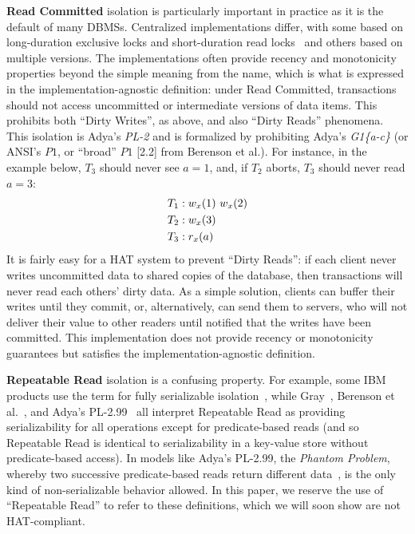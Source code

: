 \textbf{Read Committed} isolation is particularly important in
practice as it is the default of many DBMSs. Centralized
implementations differ, with some based on long-duration exclusive
locks and short-duration read locks~\cite{gray-isolation} and others
based on multiple versions. The implementations often provide recency
and monotonicity properties beyond the simple meaning from the name,
which is what is expressed in the implementation-agnostic definition:
under Read Committed, transactions should not access uncommitted or
intermediate versions of data items. This prohibits both ``Dirty
Writes'', as above, and also ``Dirty Reads'' phenomena.  This
isolation is Adya's \textit{PL-2} and is formalized by prohibiting
Adya's \textit{G1\{a-c\}} (or ANSI's $P1$, or ``broad'' $P1$ [2.2]
from Berenson et al.). For instance, in the example below, $T_3$
should never see $a=1$, and, if $T_2$ aborts, $T_3$ should never read
$a=3$:
\begin{align*}
\small\vspace{-1em}
T_1 &: w_x(1)~w_x(2)
\\T_2 &: w_x(3)\\
T_3 &: r_x(a)\vspace{-1em}
\end{align*}
It is fairly easy for a HAT system to prevent ``Dirty Reads'': if each
client never writes uncommitted data to shared copies of the database, then
transactions will never read each others' dirty data. As a simple
solution, clients can buffer their writes until they commit, or,
alternatively, can send them to servers, who will not deliver their
value to other readers until notified that the writes have been
committed. This implementation does not provide recency or
monotonicity guarantees but satisfies the implementation-agnostic
definition.

\textbf{Repeatable Read} isolation is a confusing property. For
example, some IBM products use the term for fully serializable
isolation~\cite{hat-hotos}, while Gray~\cite{gray-isolation}, Berenson
et al.~\cite{ansicritique}, and Adya's PL-2.99~\cite{adya} all
interpret Repeatable Read as providing serializability for all
operations except for predicate-based reads (and so Repeatable Read is
identical to serializability in a key-value store without
predicate-based access). In models like Adya's PL-2.99, the
\textit{Phantom Problem}, whereby two successive predicate-based reads
return different data~\cite{gray-isolation}, is the only kind of
non-serializable behavior allowed. In this paper, we reserve the use
of ``Repeatable Read'' to refer to these definitions, which we will
soon show are not HAT-compliant.

